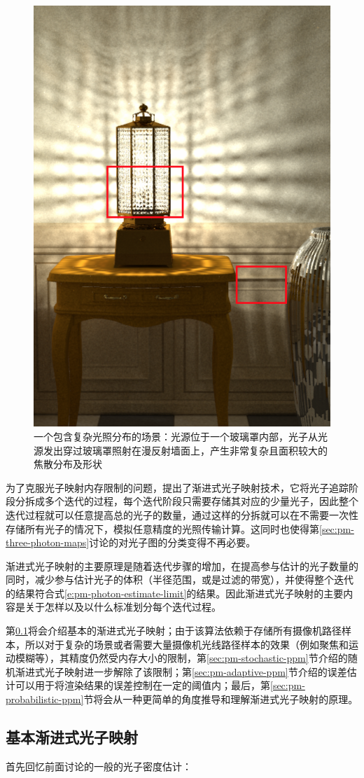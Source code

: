 \begin{figure}
\sidecaption
	\includegraphics[width=.35\textwidth]{figures/pm/pm-21}
	\caption{一个包含复杂光照分布的场景：光源位于一个玻璃罩内部，光子从光源发出穿过玻璃罩照射在漫反射墙面上，产生非常复杂且面积较大的焦散分布及形状}
	\label{f:pm-complex-caustics}
\end{figure}

为了克服光子映射内存限制的问题，\cite{a:ProgressivePhotonMapping}提出了渐进式光子映射技术，它将光子追踪阶段分拆成多个迭代的过程，每个迭代阶段只需要存储其对应的少量光子，因此整个迭代过程就可以任意提高总的光子的数量，通过这样的分拆就可以在不需要一次性存储所有光子的情况下，模拟任意精度的光照传输计算。这同时也使得第\ref{sec:pm-three-photon-maps}讨论的对光子图的分类变得不再必要。

渐进式光子映射的主要原理是随着迭代步骤的增加，在提高参与估计的光子数量的同时，减少参与估计光子的体积（半径范围，或是过滤的带宽），并使得整个迭代的结果符合式\ref{e:pm-photon-estimate-limit}的结果。因此渐进式光子映射的主要内容是关于怎样以及以什么标准划分每个迭代过程。

第\ref{sec:pm-basic-ppm}将会介绍基本的渐进式光子映射；由于该算法依赖于存储所有摄像机路径样本，所以对于复杂的场景或者需要大量摄像机光线路径样本的效果（例如聚焦和运动模糊等），其精度仍然受内存大小的限制，第\ref{sec:pm-stochastic-ppm}节介绍的随机渐进式光子映射进一步解除了该限制；第\ref{sec:pm-adaptive-ppm}节介绍的误差估计可以用于将渲染结果的误差控制在一定的阈值内；最后，第\ref{sec:pm-probabilistic-ppm}节将会从一种更简单的角度推导和理解渐进式光子映射的原理。





\subsection{基本渐进式光子映射}\label{sec:pm-basic-ppm}
首先回忆前面讨论的一般的光子密度估计：

